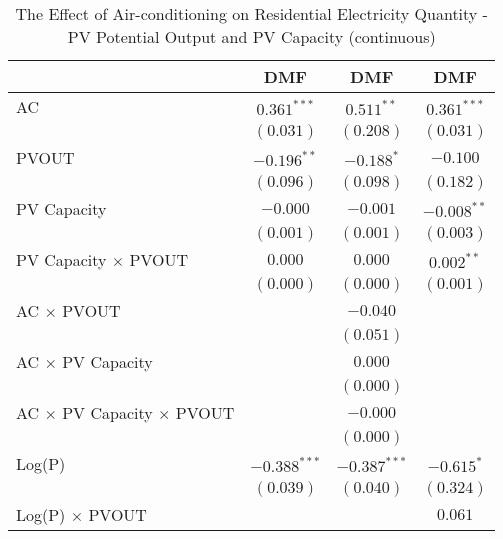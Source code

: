 
\begin{table}[htbp]
\caption{The Effect of Air-conditioning on Residential Electricity Quantity - PV Potential Output and PV Capacity (continuous)}
\begin{center}
\begin{tabular}{l c c c}
\hline
 & DMF & DMF & DMF \\
\hline
AC                                         & $0.361^{***}$  & $0.511^{**}$   & $0.361^{***}$ \\
                                           & $(0.031)$      & $(0.208)$      & $(0.031)$     \\
PVOUT                                      & $-0.196^{**}$  & $-0.188^{*}$   & $-0.100$      \\
                                           & $(0.096)$      & $(0.098)$      & $(0.182)$     \\
PV Capacity                                & $-0.000$       & $-0.001$       & $-0.008^{**}$ \\
                                           & $(0.001)$      & $(0.001)$      & $(0.003)$     \\
PV Capacity $\times$ PVOUT                 & $0.000$        & $0.000$        & $0.002^{**}$  \\
                                           & $(0.000)$      & $(0.000)$      & $(0.001)$     \\
AC $\times$ PVOUT                          &                & $-0.040$       &               \\
                                           &                & $(0.051)$      &               \\
AC $\times$ PV Capacity                    &                & $0.000$        &               \\
                                           &                & $(0.000)$      &               \\
AC $\times$ PV Capacity $\times$ PVOUT     &                & $-0.000$       &               \\
                                           &                & $(0.000)$      &               \\
Log(P)                                     & $-0.388^{***}$ & $-0.387^{***}$ & $-0.615^{*}$  \\
                                           & $(0.039)$      & $(0.040)$      & $(0.324)$     \\
Log(P) $\times$ PVOUT                      &                &                & $0.061$       \\

\end{tabular}
\end{center}
\end{table}
